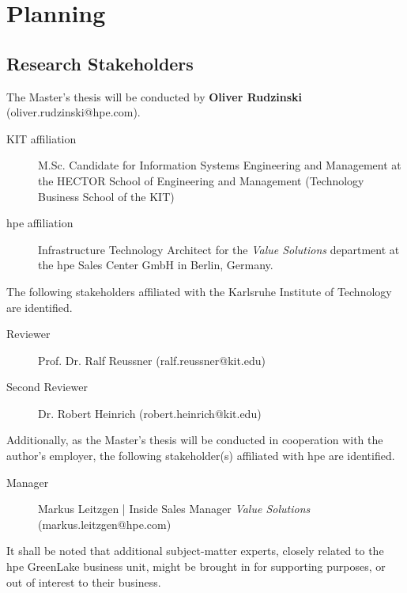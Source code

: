 {\begin{description}
	\end{description}

\chapter{Planning}
\label{ch:organization}
	
	\section{Research Stakeholders} \label{sec:organization-stakeholders}
	
	The Master's thesis will be conducted by \textbf{Oliver Rudzinski} (oliver.rudzinski@hpe.com).
	\begin{description}
		\item[KIT affiliation] M.Sc. Candidate for Information Systems Engineering and Management at the HECTOR School of Engineering and Management (Technology Business School of the KIT)
		\item[\ac{hpe} affiliation] Infrastructure Technology Architect for the \textit{Value Solutions} department at the \acl{hpe} Sales Center GmbH in Berlin, Germany. 
	\end{description}
	
	The following stakeholders affiliated with the Karlsruhe Institute of Technology are identified.
		
	\begin{description}
		\item[Reviewer] Prof. Dr. Ralf Reussner (ralf.reussner@kit.edu)
		\item[Second Reviewer] Dr. Robert Heinrich (robert.heinrich@kit.edu)
	\end{description}
	
	Additionally, as the Master's thesis will be conducted in cooperation with the author's employer, the following stakeholder(s) affiliated with \ac{hpe} are identified.
	
	\begin{description}
		\item[Manager] Markus Leitzgen | Inside Sales Manager \textit{Value Solutions} (markus.leitzgen@hpe.com) 
	\end{description}
	
	It shall be noted that additional subject-matter experts, closely related to the \ac{hpe} GreenLake business unit, might be brought in for supporting purposes, or out of interest to their business.	

}
